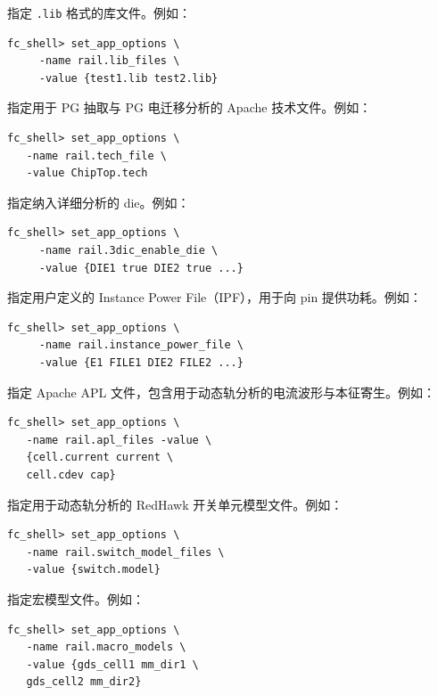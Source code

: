 \begin{description}[style=nextline,leftmargin=1.2em,font=\ttfamily]
\item[\appopt{rail.lib\_files}]
指定 \texttt{.lib} 格式的库文件。例如：
\begin{lstlisting}
fc_shell> set_app_options \
     -name rail.lib_files \
     -value {test1.lib test2.lib}
\end{lstlisting}

\item[\appopt{rail.tech\_file}]
指定用于 PG 抽取与 PG 电迁移分析的 Apache 技术文件。例如：
\begin{lstlisting}
fc_shell> set_app_options \
   -name rail.tech_file \
   -value ChipTop.tech
\end{lstlisting}

\item[\appopt{rail.3dic\_enable\_die}]
指定纳入详细分析的 die。例如：
\begin{lstlisting}
fc_shell> set_app_options \
     -name rail.3dic_enable_die \
     -value {DIE1 true DIE2 true ...}
\end{lstlisting}

\item[\appopt{rail.instance\_power\_file}]
指定用户定义的 Instance Power File（IPF），用于向 pin 提供功耗。例如：
\begin{lstlisting}
fc_shell> set_app_options \
     -name rail.instance_power_file \
     -value {E1 FILE1 DIE2 FILE2 ...}
\end{lstlisting}

\item[\appopt{rail.apl\_files}]
指定 Apache APL 文件，包含用于动态轨分析的电流波形与本征寄生。例如：
\begin{lstlisting}
fc_shell> set_app_options \
   -name rail.apl_files -value \
   {cell.current current \
   cell.cdev cap}
\end{lstlisting}

\item[\appopt{rail.switch\_model\_files}]
指定用于动态轨分析的 RedHawk 开关单元模型文件。例如：
\begin{lstlisting}
fc_shell> set_app_options \
   -name rail.switch_model_files \
   -value {switch.model}
\end{lstlisting}

\item[\appopt{rail.macro\_models}]
指定宏模型文件。例如：
\begin{lstlisting}
fc_shell> set_app_options \
   -name rail.macro_models \
   -value {gds_cell1 mm_dir1 \
   gds_cell2 mm_dir2}
\end{lstlisting}


\end{description}
